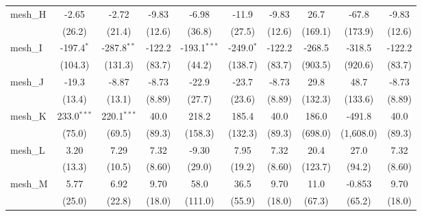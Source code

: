 \begin{tabular}{lccccccccc}
   mesh\_H                                                     & -2.65         & -2.72         & -9.83         & -6.98          & -11.9         & -9.83         & 26.7    & -67.8     & -9.83\\   
                                                               & (26.2)        & (21.4)        & (12.6)        & (36.8)         & (27.5)        & (12.6)        & (169.1) & (173.9)   & (12.6)\\   
   mesh\_I                                                     & -197.4$^{*}$  & -287.8$^{**}$ & -122.2        & -193.1$^{***}$ & -249.0$^{*}$  & -122.2        & -268.5  & -318.5    & -122.2\\   
                                                               & (104.3)       & (131.3)       & (83.7)        & (44.2)         & (138.7)       & (83.7)        & (903.5) & (920.6)   & (83.7)\\   
   mesh\_J                                                     & -19.3         & -8.87         & -8.73         & -22.9          & -23.7         & -8.73         & 29.8    & 48.7      & -8.73\\   
                                                               & (13.4)        & (13.1)        & (8.89)        & (27.7)         & (23.6)        & (8.89)        & (132.3) & (133.6)   & (8.89)\\   
   mesh\_K                                                     & 233.0$^{***}$ & 220.1$^{***}$ & 40.0          & 218.2          & 185.4         & 40.0          & 186.0   & -491.8    & 40.0\\   
                                                               & (75.0)        & (69.5)        & (89.3)        & (158.3)        & (132.3)       & (89.3)        & (698.0) & (1,608.0) & (89.3)\\   
   mesh\_L                                                     & 3.20          & 7.29          & 7.32          & -9.30          & 7.95          & 7.32          & 20.4    & 27.0      & 7.32\\   
                                                               & (13.3)        & (10.5)        & (8.60)        & (29.0)         & (19.2)        & (8.60)        & (123.7) & (94.2)    & (8.60)\\   
   mesh\_M                                                     & 5.77          & 6.92          & 9.70          & 58.0           & 36.5          & 9.70          & 11.0    & -0.853    & 9.70\\   
                                                               & (25.0)        & (22.8)        & (18.0)        & (111.0)        & (55.9)        & (18.0)        & (67.3)  & (65.2)    & (18.0)\\   

\end{tabular}
